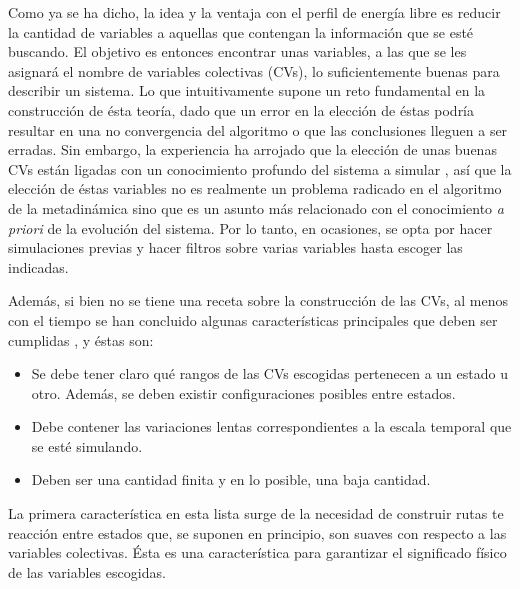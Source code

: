\documentclass [11pt]{article}
\begin{document}
Como ya se ha dicho, la idea y la ventaja con el perfil de energía libre es reducir la cantidad de variables a aquellas que contengan la información que se esté buscando. El objetivo es entonces encontrar unas variables, a las que se les asignará el nombre de variables colectivas (CVs), lo suficientemente buenas para describir un sistema. Lo que intuitivamente supone un reto fundamental en la construcción de ésta teoría, dado que un error en la elección de éstas podría resultar en una no convergencia del algoritmo o que las conclusiones lleguen a ser erradas. Sin embargo, la experiencia ha arrojado que la elección de unas buenas CVs están ligadas con un conocimiento profundo del sistema a simular \cite{branduardi}, así que la elección de éstas variables no es realmente un problema radicado en el algoritmo de la metadinámica sino que es un asunto más relacionado con el conocimiento {\it a priori} de la evolución del sistema. Por lo tanto, en ocasiones, se opta por hacer simulaciones previas y hacer filtros sobre varias variables hasta escoger las indicadas. 

Además, si bien no se tiene una receta sobre la construcción de las CVs, al menos con el tiempo se han concluido algunas características principales que deben ser cumplidas \cite{barducci}, y éstas son:
\begin{itemize}
    \item Se debe tener claro qué rangos de las CVs escogidas pertenecen a un estado u otro. Además, se deben existir configuraciones posibles entre estados.
    \item Debe contener las variaciones lentas correspondientes a la escala temporal que se esté simulando.
    \item Deben ser una cantidad finita y en lo posible, una baja cantidad. 
\end{itemize}

La primera característica en esta lista surge de la necesidad de construir rutas te reacción entre estados que, se suponen en principio, son suaves con respecto a las variables colectivas. Ésta es una característica para garantizar el significado físico de las variables escogidas.
\end{document}
